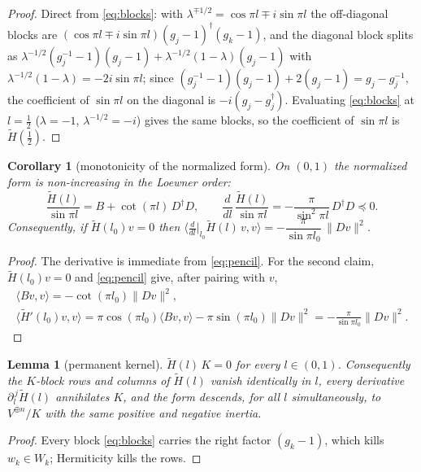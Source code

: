 \documentclass[11pt]{article}
\newtheorem{lemma}[theorem]{Lemma}
\newtheorem{corollary}[theorem]{Corollary}
\theoremstyle{definition}
\newcommand{\Ht}{\widetilde H}
\begin{document}
\begin{proof}
Direct from \eqref{eq:blocks}: with $\lambda^{\mp1/2}=\cos\pi l\mp
i\sin\pi l$ the off-diagonal blocks are
$(\cos\pi l\mp i\sin\pi l)(g_j-1)^{\dagger}(g_k-1)$, and the diagonal
block splits as
$\lambda^{-1/2}(g_j^{-1}-1)(g_j-1)+\lambda^{-1/2}(1-\lambda)(g_j-1)$
with $\lambda^{-1/2}(1-\lambda)=-2i\sin\pi l$; since
$(g_j^{-1}-1)(g_j-1)+2(g_j-1)=g_j-g_j^{-1}$, the coefficient of
$\sin\pi l$ on the diagonal is $-i(g_j-g_j^{\dagger})$. Evaluating
\eqref{eq:blocks} at $l=\tfrac12$ ($\lambda=-1$,
$\lambda^{-1/2}=-i$) gives the same blocks, so the coefficient of
$\sin\pi l$ is $\Ht(\tfrac12)$.
\end{proof}

\begin{corollary}[monotonicity of the normalized form]\label{cor:pencil}
On $(0,1)$ the normalized form is non-increasing in the Loewner
order:
\[
\frac{\Ht(l)}{\sin\pi l}=B+\cot(\pi l)\,D^{\dagger}D,
\qquad
\frac{d}{dl}\,\frac{\Ht(l)}{\sin\pi l}=-\frac{\pi}{\sin^{2}\pi l}\,D^{\dagger}D\preceq0 .
\]
Consequently, if $\Ht(l_0)v=0$ then
$\bigl\langle\tfrac{d}{dl}\big|_{l_0}\Ht(l)\,v,v\bigr\rangle
=-\dfrac{\pi}{\sin\pi l_0}\,\lVert Dv\rVert^{2}$.
\end{corollary}

\begin{proof}
The derivative is immediate from \eqref{eq:pencil}. For the second
claim, $\Ht(l_0)v=0$ and \eqref{eq:pencil} give, after pairing with $v$,
\begin{gather*}
\langle Bv,v\rangle=-\cot(\pi l_0)\lVert Dv\rVert^{2},\\
\langle\Ht'(l_0)v,v\rangle=\pi\cos(\pi l_0)\langle Bv,v\rangle
-\pi\sin(\pi l_0)\lVert Dv\rVert^{2}
=-\frac{\pi}{\sin\pi l_0}\lVert Dv\rVert^{2}.
\end{gather*}
\end{proof}


\begin{lemma}[permanent kernel]\label{lem:permker}
$\Ht(l)\,K=0$ for every $l\in(0,1)$. Consequently the $K$-block rows
and columns of $\Ht(l)$ vanish identically in $l$, every derivative
$\partial_l^{\,j}\Ht(l)$ annihilates $K$, and the form descends, for
all $l$ simultaneously, to $V^{\oplus n}/K$ with the same positive and
negative inertia.
\end{lemma}

\begin{proof}
Every block \eqref{eq:blocks} carries the right factor $(g_k-1)$,
which kills $w_k\in W_k$; Hermiticity kills the rows.
\end{proof}
\end{document}
